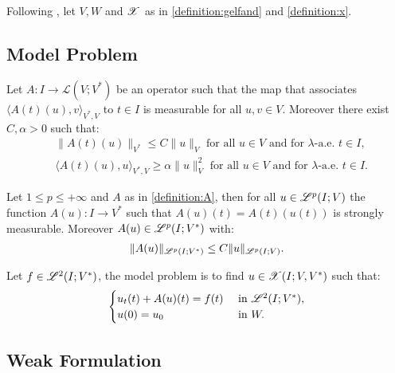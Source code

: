 Following \cite[p. 124]{Ern2021}, let $V, W$ and $\mathscr{X}$ as in \ref{definition:gelfand} and \ref{definition:x}.

\subsection{Model Problem}

\begin{definition}[A] \label{definition:A}
    Let $A \colon I \rightarrow \mathcal{L}(V;V^*)$ be an operator such that the map that associates $\langle A(t)(u), v \rangle_{V^*, V}$ to $t \in I$ is measurable for all $u, v \in V$. Moreover there exist $C, \alpha > 0$ such that:
    \begin{align} \label{equation:a}
        & \lVert A(t)(u) \rVert_{V^*} \leq C \lVert u \rVert_V \text{ for all } u \in V \text{ and for } \lambda \text{-a.e. } t \in I, \\
        & \langle A(t)(u), u \rangle_{V^*, V} \geq \alpha \lVert u \rVert_V^2 \text{ for all } u \in V \text{ and for } \lambda \text{-a.e. } t \in I.
    \end{align}
\end{definition}

\begin{lemma}
    Let $1 \leq p \leq +\infty$ and  $A$ as in \ref{definition:A}, then for all $u \in \mathscr{L}^{p}(I; V)$ the function $A(u) \colon I \rightarrow V^*$ such that $A(u)(t) = A(t)(u(t))$ is strongly measurable. Moreover $A(u) \in \mathscr{L}^{p}(I; V^*)$ with:
    \begin{gather}
        \lVert A(u) \rVert_{\mathscr{L}^{p}(I; V^*)} \leq C \lVert u \rVert_{\mathscr{L}^{p}(I; V)}.
    \end{gather}
\end{lemma}

\begin{definition} \label{definition:model}
    Let $f \in \mathscr{L}^{2}(I; V^*)$, the model problem is to find $u \in \mathscr{X}(I; V, V^*)$ such that:
    \begin{gather}
        \begin{cases}
            u_t(t) + A(u)(t) = f(t) & \text{ in } \mathscr{L}^{2}(I; V^*), \\
            u(0) = u_0 & \text{ in } W.
        \end{cases}
    \end{gather}
\end{definition}

\newpage
\subsection{Weak Formulation}

